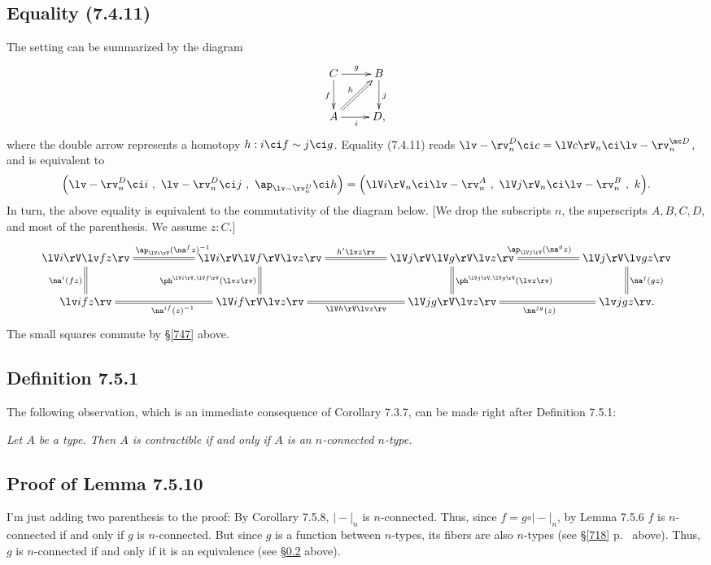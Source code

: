 \documentclass[12pt]{article}
\begin{document}
\subsection{Equality (7.4.11)}

The setting can be summarized by the diagram 
$$
\xymatrix{C\ar[r]^g\ar[d]_f&B\ar[d]^j\\ A\ar[r]_i\ar@{=>}[ur]^h&D,}
$$ 
where the double arrow represents a homotopy $h:i\ci f\sim j\ci g$. Equality (7.4.11) reads $\lv-\rv^D_n\ci c=\lV c\rV_n\ci\lv-\rv^{\mc D}_n$, and is equivalent to
$$
\Big(\lv-\rv^D_n\ci i\ ,\ \lv-\rv^D_n\ci j\ ,\ \ap_{\lv-\rv^D_n}\ci h\Big)
=
\Big(\lV i\rV_n\ci\lv-\rv^A_n\ ,\ \lV j\rV_n\ci\lv-\rv^B_n\ ,\ k\Big).
$$
In turn, the above equality is equivalent to the commutativity of the diagram below. [We drop the subscripts $n$, the superscripts $A,B,C,D$, and most of the parenthesis. We assume $z:C$.] 
$$ 
\xymatrix{
\lV i\rV\lv fz\rv\ar@{=}[d]_{\na^i(fz)}&&
\lV i\rV\lV f\rV\lv z\rv\ar@{=}[ll]_{\ap_{\lV i\rV}(\na^fz)^{-1}}\ar@{=}[d]_{\ph^{\lV i\rV,\lV f\rV}(\lv z\rv)}\ar@{=}[rr]^{h'\lv z\rv}&&
\lV j\rV\lV g\rV\lv z\rv\ar@{=}[d]^{\ph^{\lV j\rV,\lV g\rV}(\lv z\rv)}\ar@{=}[rr]^{\ap_{\lV j\rV}(\na^gz)}&&
\lV j\rV\lv gz\rv\ar@{=}[d]^{\na^j(gz)}\\
%
\lv ifz\rv&&\lV if\rV\lv z\rv\ar@{=}[rr]_{\lV h\rV\lv z\rv}\ar@{=}[ll]^{\na^{if}(z)^{-1}}&&\lV jg\rV\lv z\rv\ar@{=}[rr]_{\na^{jg}(z)}&&\lv jgz\rv.}
$$ 
The small squares commute by \S\ref{747} above.


\subsection{Definition 7.5.1}\label{751}

The following observation, which is an immediate consequence of Corollary 7.3.7, can be made right after Definition 7.5.1:

\nn\emph{Let $A$ be a type. Then $A$ is contractible if and only if $A$ is an $n$-connected $n$-type.}


\subsection{Proof of Lemma 7.5.10}

I'm just adding two parenthesis to the proof: By Corollary 7.5.8, $\vert-\vert_n$ is $n$-connected. Thus, since $f=g\circ\vert-\vert_n$, by Lemma 7.5.6 $f$ is $n$-connected if and only if $g$ is $n$-connected. But since $g$ is a function between $n$-types, its fibers are also $n$-types (see \S\ref{718} p.~\pageref{718} above). Thus, $g$ is $n$-connected if and only if it is an equivalence (see \S\ref{751} above).
\end{document}
